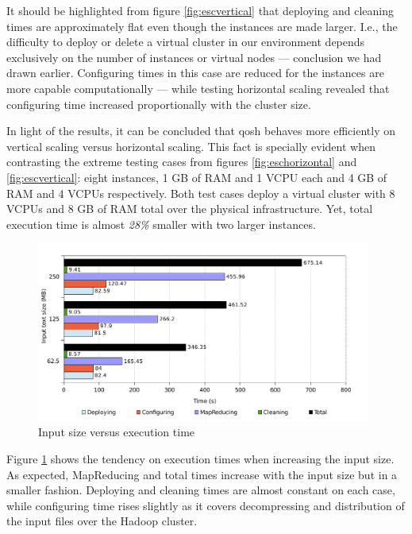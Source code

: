 It should be highlighted from figure \ref{fig:escvertical} that deploying and cleaning times are approximately flat even though the instances are made larger. I.e., the difficulty to deploy or delete a virtual cluster in our environment depends exclusively on the number of instances or virtual nodes --- conclusion we had drawn earlier. Configuring times in this case are reduced for the instances are more capable computationally --- while testing horizontal scaling revealed that configuring time increased proportionally with the cluster size.

In light of the results, it can be concluded that qosh behaves more efficiently on vertical scaling versus horizontal scaling. This fact is specially evident when contrasting the extreme testing cases from figures \ref{fig:eschorizontal} and \ref{fig:escvertical}: eight instances, 1 GB of RAM and 1 VCPU each and 4 GB of RAM and 4 VCPUs respectively. Both test cases deploy a virtual cluster with 8 VCPUs and 8 GB of RAM total over the physical infrastructure. Yet, total execution time is almost \emph{28\%} smaller with two larger instances.

\begin{figure}[tbp]
\begin{center}
\includegraphics[width=0.98\textwidth]{imagenes/042.pdf}
\caption{Input size versus execution time}
\label{fig:evotemporal}
\end{center}
\end{figure}

Figure \ref{fig:evotemporal} shows the tendency on execution times when increasing the input size. As expected, MapReducing and total times increase with the input size but in a smaller fashion. Deploying and cleaning times are almost constant on each case, while configuring time rises slightly as it covers decompressing and distribution of the input files over the Hadoop cluster.
